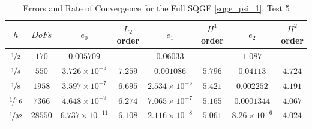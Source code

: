 \begin{table}[H]
\begin{center}
\begin{tabular}{|c|c|c|c|c|c|c|c|}%
  \hline
  $h$ & $DoFs$ & $e_0$ & $L_2$ order & $e_1$ & $H^1$ order & $e_2$ & $H^2$ order \\[0.2em] %
  \hline
  $\nicefrac{1}{2}$ & $170$ & $0.005709$ & $-$ & $0.06033$ & $-$ & $1.087$ & $-$ \\[0.2em] %
  $\nicefrac{1}{4}$ & $550$ & $3.726\times 10^{-5}$ & $7.259$ & $0.001086$ & $5.796$ & $0.04113$ & $4.724$ \\[0.2em] %
  $\nicefrac{1}{8}$ & $1958$ & $3.597\times 10^{-7}$ & $6.695$ & $2.534\times 10^{-5}$ & $5.421$ & $0.002252$ & $4.191$ \\[0.2em] %
  $\nicefrac{1}{16}$ & $7366$ & $4.648\times 10^{-9}$ & $6.274$ & $7.065\times 10^{-7}$ & $5.165$ & $0.0001344$ & $4.067$\\[0.2em] %
  $\nicefrac{1}{32}$ & $28550$ & $6.737\times 10^{-11}$ & $6.108$ & $2.116\times 10^{-8}$ & $5.061$ & $8.26\times 10^{-6}$ & $4.024$ \\[0.2em] %
 \hline
\end{tabular}
\end{center}
\caption{Errors and Rate of Convergence for the Full SQGE \eqref{sqge_psi_1}, Test 5}
\label{tab:SQGEsinErrors}
\end{table}

